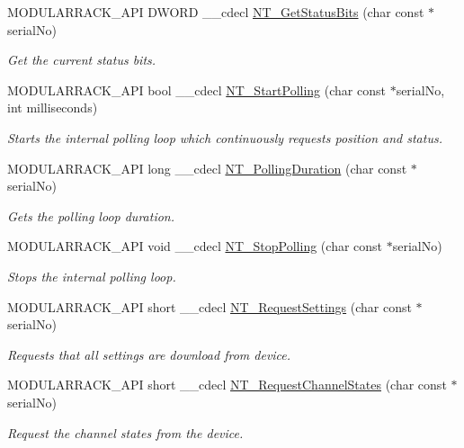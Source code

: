 \begin{DoxyCompactItemize}
M\+O\+D\+U\+L\+A\+R\+R\+A\+C\+K\+\_\+\+A\+PI D\+W\+O\+RD \+\_\+\+\_\+cdecl \hyperlink{group___modular_nano_trak_gad7b55b829990f874c905e8e9b0230915}{N\+T\+\_\+\+Get\+Status\+Bits} (char const $\ast$serial\+No)
\begin{DoxyCompactList}\small\item\em Get the current status bits. \end{DoxyCompactList}\item 
M\+O\+D\+U\+L\+A\+R\+R\+A\+C\+K\+\_\+\+A\+PI bool \+\_\+\+\_\+cdecl \hyperlink{group___modular_nano_trak_ga7b165e6df40145faac5d37f968d3b68b}{N\+T\+\_\+\+Start\+Polling} (char const $\ast$serial\+No, int milliseconds)
\begin{DoxyCompactList}\small\item\em Starts the internal polling loop which continuously requests position and status. \end{DoxyCompactList}\item 
M\+O\+D\+U\+L\+A\+R\+R\+A\+C\+K\+\_\+\+A\+PI long \+\_\+\+\_\+cdecl \hyperlink{group___modular_nano_trak_ga0c89b372048308c5457fd5a454d4ba4a}{N\+T\+\_\+\+Polling\+Duration} (char const $\ast$serial\+No)
\begin{DoxyCompactList}\small\item\em Gets the polling loop duration. \end{DoxyCompactList}\item 
M\+O\+D\+U\+L\+A\+R\+R\+A\+C\+K\+\_\+\+A\+PI void \+\_\+\+\_\+cdecl \hyperlink{group___modular_nano_trak_ga5cf224e75cdeced29a7ac9eb38efd91e}{N\+T\+\_\+\+Stop\+Polling} (char const $\ast$serial\+No)
\begin{DoxyCompactList}\small\item\em Stops the internal polling loop. \end{DoxyCompactList}\item 
M\+O\+D\+U\+L\+A\+R\+R\+A\+C\+K\+\_\+\+A\+PI short \+\_\+\+\_\+cdecl \hyperlink{group___modular_nano_trak_ga6a179ca39fc4bddb7ed876b7cc58b364}{N\+T\+\_\+\+Request\+Settings} (char const $\ast$serial\+No)
\begin{DoxyCompactList}\small\item\em Requests that all settings are download from device. \end{DoxyCompactList}\item 
M\+O\+D\+U\+L\+A\+R\+R\+A\+C\+K\+\_\+\+A\+PI short \+\_\+\+\_\+cdecl \hyperlink{group___modular_nano_trak_gae557fe7e16c622ea261a5fdcf2e702ae}{N\+T\+\_\+\+Request\+Channel\+States} (char const $\ast$serial\+No)
\begin{DoxyCompactList}\small\item\em Request the channel states from the device. \end{DoxyCompactList}\item 

\end{DoxyCompactItemize}
